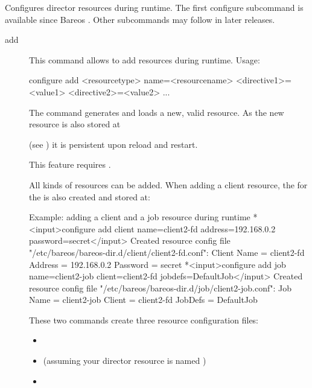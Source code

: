\begin{description}
    Configures director resources during runtime.
    The first configure subcommand  is available since Bareos .
    Other subcommands may follow in later releases.

    \begin{description}
    \item[add]
        \label{sec:bcommandConfigureAdd}

        This command allows to add resources during runtime.
        Usage:
\begin{bconsole}{}
configure add <resourcetype> name=<resourcename> <directive1>=<value1> <directive2>=<value2> ...
\end{bconsole}

    The command generates and loads a new, valid resource.
    As the new resource is also stored at


    (see ) it is persistent upon reload and restart.

    This feature requires .

    All kinds of resources can be added.
    When adding a client resource, the  for the \bareosFd is also created
    and stored at:


\begin{bconsole}{Example: adding a client and a job resource during runtime}
*<input>configure add client name=client2-fd address=192.168.0.2 password=secret</input>
Created resource config file "/etc/bareos/bareos-dir.d/client/client2-fd.conf":
Client {
  Name = client2-fd
  Address = 192.168.0.2
  Password = secret
}
*<input>configure add job name=client2-job client=client2-fd jobdefs=DefaultJob</input>
Created resource config file "/etc/bareos/bareos-dir.d/job/client2-job.conf":
Job {
  Name = client2-job
  Client = client2-fd
  JobDefs = DefaultJob
}
\end{bconsole}

These two commands create three resource configuration files:
\begin{itemize}
  \item {}
  \item {} (assuming your director resource is named )
  \item {}
\end{itemize}


\end{description}
\end{description}
